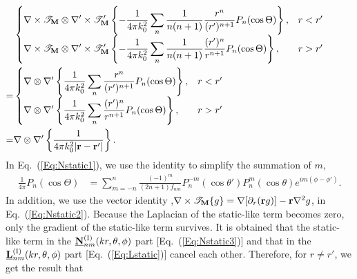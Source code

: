 \documentclass[journal=jacsat,manuscript=article,layout=traditional]{achemso}
\newcommand*\br{\mathbf{r}}
\newcommand{\norF}[1]{\underline{\vb{#1}}}
\newcommand{\RomanI}{\scriptsize\textrm{I}}
\begin{document}
\begin{align}
    \label{Eq:Nstatic1}
    &\begin{cases}
        \displaystyle
        \nabla\times\mathcal{T}_{\vb{M}}\otimes\nabla'\times\mathcal{T}_{\vb{M}}'
        \left\{
        -\frac{1}{4\pi k_0^{2}}\sum_n\frac{1}{n(n+1)}
        \frac{r^n}{(r')^{n+1}}P_n(\cos\Theta)\right\}, & r<r'\\
        \displaystyle
        \nabla\times\mathcal{T}_{\vb{M}}\otimes\nabla'\times\mathcal{T}_{\vb{M}}'
        \left\{-\frac{1}{4\pi k_0^{2}}\sum_n\frac{1}{n(n+1)}
        \frac{(r')^n}{r^{n+1}}P_n(\cos\Theta)\right\}, & r>r'\\
    \end{cases}\hspace{1.05 cm}\\
    \label{Eq:Nstatic2}
    =&\begin{cases}
        \displaystyle
        \nabla\otimes\nabla'
        \left\{
        \frac{1}{4\pi k_0^{2}}\sum_n
        \frac{r^n}{(r')^{n+1}}P_n(\cos\Theta)\right\}, & r<r'\\
        \displaystyle
        \nabla\otimes\nabla'
        \left\{\frac{1}{4\pi k_0^{2}}\sum_n
        \frac{(r')^n}{r^{n+1}}P_n(\cos\Theta)\right\}, & r>r'\\
    \end{cases}\\
    \label{Eq:Nstatic3}
    =&\nabla\otimes\nabla'
    \left\{\frac{1}{4\pi k_0^2\abs{\br-\br'}}\right\}.
\end{align}
In Eq.~(\ref{Eq:Nstatic1}), we use the identity to simplify the summation of $m$,\begin{align}
    \frac{1}{4\pi}P_n(\cos\Theta)
    &=\sum_{m=-n}^n\frac{(-1)^m}{(2n+1)f_{nm}}P_n^{-m}(\cos\theta') P_n^m(\cos\theta)
    e^{im(\phi-\phi')}.
\end{align}
In addition, we use the vector identity ,$\nabla\times\mathcal{T}_{\vb{M}}\{g\}=\nabla[\partial_r(\br g)]-\br\nabla^2g$, in Eq.~(\ref{Eq:Nstatic2}).
Because the Laplacian of the static-like term becomes zero, only the gradient of the static-like term survives.
It is obtained that the static-like term in the $\norF{N}_{nm}^{(\RomanI)}(kr,\theta,\phi)$ part [Eq.~(\ref{Eq:Nstatic3})] and that in the $\norF{L}_{nm}^{(\RomanI)}(kr,\theta,\phi)$ part [Eq.~(\ref{Eq:Lstatic})] cancel each other.
Therefore, for $r\neq r'$, we get the result that
\end{document}
